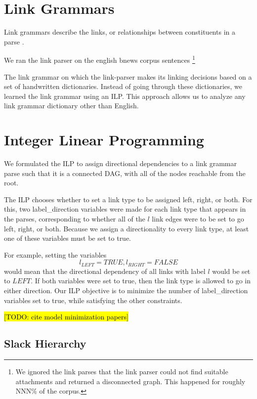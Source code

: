 \documentclass[11pt]{article}
\newcommand{\Note}[1]{}
\renewcommand{\Note}[1]{\hl{[#1]}}  %
\newcommand{\TODO}[1]{\Note{TODO: #1}}
\begin{document}
\section{Link Grammars}

Link grammars describe the links, or relationships between constituents in a parse \cite{SleatorTemperly91}. 


We ran the link parser on the english bnews corpus sentences \footnote{We ignored the link parses that the link parser could not find suitable attachments and returned a disconnected graph. This happened for roughly NNN\% of the corpus.}

The link grammar on which the link-parser makes its linking decisions based on a set of handwritten dictionaries. Instead of going through these dictionaries, we learned the link grammar using an ILP. This approach allows us to analyze any link grammar dictionary other than English.



\section{Integer Linear Programming}

We formulated the ILP to assign directional dependencies to a link grammar parse such that it is a connected DAG, with all of the nodes reachable from the root.

The ILP chooses whether to set a link type to be assigned left, right, or both. For this, two label\_direction variables were made for each link type that appears in the parses, corresponding to whether all of the $l$ link edges were to be set to go left, right, or both. Because we assign a directionality to every link type, at least one of these variables must be set to true.

For example, setting the variables $$l_{LEFT} = TRUE, l_{RIGHT} = FALSE$$ would mean that the directional dependency of all links with label $l$ would be set to $LEFT$. If both variables were set to true, then the link type is allowed to go in either direction. Our ILP objective is to minimize the number of label\_direction variables set to true, while satisfying the other constraints.

\TODO{cite model minimization papers}


\subsection{Slack Hierarchy}
\end{document}
